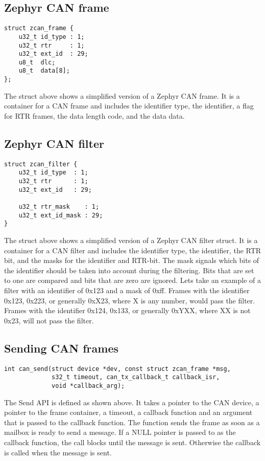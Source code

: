 \subsection{Zephyr CAN frame}
\begin{lstlisting}[style=ccode, numbers=none]
struct zcan_frame {
	u32_t id_type : 1;
	u32_t rtr     : 1;
	u32_t ext_id  : 29;
	u8_t  dlc;
	u8_t  data[8];
};
\end{lstlisting}
The struct above shows a simplified version of a Zephyr CAN frame.
It is a container for a CAN frame and includes the identifier type, the identifier, a flag for RTR frames, the data length code, and the data data.

\subsection{Zephyr CAN filter}
\begin{lstlisting}[style=ccode, numbers=none]
struct zcan_filter {
	u32_t id_type  : 1;
	u32_t rtr      : 1;
	u32_t ext_id   : 29;

	u32_t rtr_mask    : 1;
	u32_t ext_id_mask : 29;
}
\end{lstlisting}
The struct above shows a simplified version of a Zephyr CAN filter struct.
It is a container for a CAN filter and includes the identifier type, the identifier, the RTR bit, and the masks for the identifier and RTR-bit.
The mask signals which bits of the identifier should be taken into account during the filtering.
Bits that are set to one are compared and bits that are zero are ignored.
Lets take an example of a filter with an identifier of 0x123 and a mask of 0xff.
Frames with the identifier 0x123, 0x223, or generally 0xX23, where X is any number, would pass the filter.
Frames with the identifier 0x124, 0x133, or generally 0xYXX, where XX is not 0x23, will not pass the filter.

\subsection{Sending CAN frames}
\begin{lstlisting}[style=ccode, numbers=none]
int can_send(struct device *dev, const struct zcan_frame *msg,
             s32_t timeout, can_tx_callback_t callback_isr,
             void *callback_arg);
\end{lstlisting}
The Send API is defined as shown above.
It takes a pointer to the CAN device, a pointer to the frame container, a timeout, a callback function and an argument that is passed to the callback function.
The function sends the frame as soon as a mailbox is ready to send a message.
If a NULL pointer is passed to as the callback function, the call blocks until the message is sent.
Otherwise the callback is called when the message is sent.

